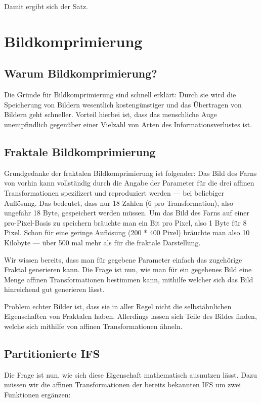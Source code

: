 \documentclass[afourpaper]{tufte-handout}
\begin{document}
Damit ergibt sich der Satz.

\section{Bildkomprimierung}

\subsection{Warum Bildkomprimierung?}

Die Gründe für Bildkomprimierung sind schnell erklärt: Durch sie wird die Speicherung von Bildern wesentlich kostengünstiger und das Übertragen von Bildern geht schneller. Vorteil hierbei ist, dass das menschliche Auge unempfindlich gegenüber einer Vielzahl von Arten des Informationsverlustes ist.

\subsection{Fraktale Bildkomprimierung}

Grundgedanke der fraktalen Bildkomprimierung ist folgender: Das Bild des Farns von vorhin kann vollständig durch die Angabe der Parameter für die drei affinen Transformationen spezifizert und reproduziert werden --- bei beliebiger Auflösung. Das bedeutet, dass nur 18 Zahlen (6 pro Transformation), also ungefähr 18 Byte, gespeichert werden müssen. Um das Bild des Farns auf einer pro-Pixel-Basis zu speichern bräuchte man ein Bit pro Pixel, also 1 Byte für 8 Pixel. Schon für eine geringe Auflösung (200 * 400 Pixel) bräuchte man also 10 Kilobyte --- über 500 mal mehr als für die fraktale Darstellung.

Wir wissen bereits, dass man für gegebene Parameter einfach das zugehörige Fraktal generieren kann. Die Frage ist nun, wie man für ein gegebenes Bild eine Menge affinen Transformationen bestimmen kann, mithilfe welcher sich das Bild hinreichend gut generieren lässt.

Problem echter Bilder ist, dass sie in aller Regel nicht die selbstähnlichen Eigenschaften von Fraktalen haben. Allerdings lassen sich Teile des Bildes finden, welche sich mithilfe von affinen Transformationen ähneln.

\subsection{Partitionierte IFS}

Die Frage ist nun, wie sich diese Eigenschaft mathematisch ausnutzen lässt. Dazu müssen wir die affinen Transformationen der bereits bekannten IFS um zwei Funktionen ergänzen:
\end{document}
